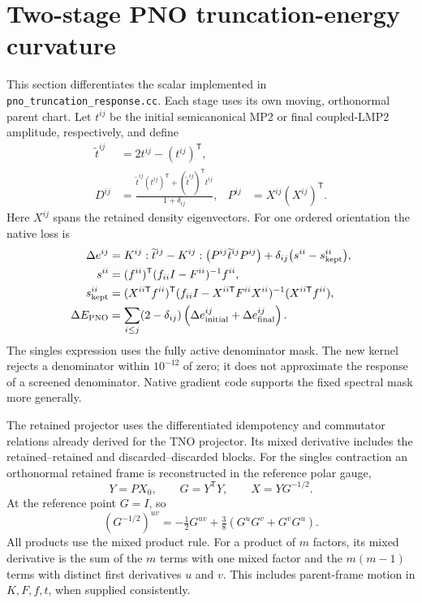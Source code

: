 \documentclass[11pt]{article}
\begin{document}
\section{Two-stage PNO truncation-energy curvature}
This section differentiates the scalar implemented in
\texttt{pno\_truncation\_response.cc}. Each stage uses its own moving,
orthonormal parent chart. Let $t^{ij}$ be the initial semicanonical MP2
or final coupled-LMP2 amplitude, respectively, and define
\begin{align}
 \widetilde t^{ij}&=2t^{ij}-(t^{ij})^{\mathsf T},\\
 D^{ij}&=\frac{\widetilde t^{ij}(t^{ij})^{\mathsf T}
                  +(\widetilde t^{ij})^{\mathsf T}t^{ij}}{1+\delta_{ij}},
 &P^{ij}&=X^{ij}(X^{ij})^{\mathsf T}.
\end{align}
Here $X^{ij}$ spans the retained density eigenvectors. For one ordered
orientation the native loss is
\begin{align}
 \Delta e^{ij}&=K^{ij}:\widetilde t^{ij}
       -K^{ij}:\bigl(P^{ij}\widetilde t^{ij}P^{ij}\bigr)
       +\delta_{ij}\bigl(s^{ii}-s^{ii}_{\rm kept}\bigr),\\
 s^{ii}&=(f^{ii})^{\mathsf T}(f_{ii}I-F^{ii})^{-1}f^{ii},\\
 s^{ii}_{\rm kept}&=(X^{ii\mathsf T}f^{ii})^{\mathsf T}
  (f_{ii}I-X^{ii\mathsf T}F^{ii}X^{ii})^{-1}(X^{ii\mathsf T}f^{ii}),\\
 \Delta E_{\rm PNO}&=\sum_{i\leq j}(2-\delta_{ij})
       \left(\Delta e^{ij}_{\rm initial}+\Delta e^{ij}_{\rm final}\right).
\end{align}
The singles expression uses the fully active denominator mask. The new
kernel rejects a denominator within $10^{-12}$ of zero; it does not
approximate the response of a screened denominator. Native gradient
code supports the fixed spectral mask more generally.

The retained projector uses the differentiated idempotency and commutator
relations already derived for the TNO projector. Its mixed derivative
includes the retained--retained and discarded--discarded blocks.
For the singles contraction an orthonormal retained frame is reconstructed
in the reference polar gauge,
\begin{equation}
 Y=P X_0,\qquad G=Y^{\mathsf T}Y,\qquad X=Y G^{-1/2}.
\end{equation}
At the reference point $G=I$, so
\begin{equation}
 (G^{-1/2})^{uv}=-\tfrac12 G^{uv}
       +\tfrac38(G^uG^v+G^vG^u).
\end{equation}
All products use the mixed product rule. For a product of $m$ factors,
its mixed derivative is the sum of the $m$ terms with one mixed factor
and the $m(m-1)$ terms with distinct first derivatives $u$ and $v$.
This includes parent-frame motion in $K,F,f,t$, when supplied consistently.
\end{document}
